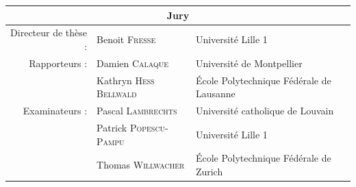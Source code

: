 \begin{titlepage}
  \vfill
  \large
  \begin{center}
    \begin{tabular}{rll}
      \multicolumn{3}{c}{Jury}                                                                         \\
      \midrule
      Directeur de thèse : & Benoit \textsc{Fresse}         & Université Lille 1                       \\
      Rapporteurs :        & Damien \textsc{Calaque}        & Université de Montpellier                \\
                           & Kathryn \textsc{Hess Bellwald} & École Polytechnique Fédérale de Lausanne \\
      Examinateurs :       & Pascal \textsc{Lambrechts}     & Université catholique de Louvain         \\
                           & Patrick \textsc{Popescu-Pampu} & Université Lille 1                       \\
                           & Thomas \textsc{Willwacher}     & École Polytechnique Fédérale de Zurich   \\
    \end{tabular}
  \end{center}
\end{titlepage}

\restoregeometry{}

